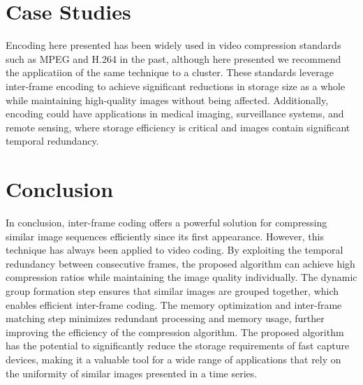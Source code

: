\documentclass[twocolumn]{article}
\begin{document}
\section{Case Studies}
Encoding here presented has been widely used in video compression standards such as MPEG and H.264 in the past, although here presented we recommend the applicatiion of the same technique to a cluster. These standards leverage inter-frame encoding to achieve significant reductions in storage size as a whole while maintaining high-quality images without being affected. Additionally, encoding could have applications in medical imaging, surveillance systems, and remote sensing, where storage efficiency is critical and images contain significant temporal redundancy.

\section{Conclusion}
In conclusion, inter-frame coding offers a powerful solution for compressing similar image sequences efficiently since its first appearance. However, this technique has always been applied to video coding. By exploiting the temporal redundancy between consecutive frames, the proposed algorithm can achieve high compression ratios while maintaining the image quality individually. The dynamic group formation step ensures that similar images are grouped together, which enables efficient inter-frame coding. The memory optimization and inter-frame matching step minimizes redundant processing and memory usage, further improving the efficiency of the compression algorithm. The proposed algorithm has the potential to significantly reduce the storage requirements of fast capture devices, making it a valuable tool for a wide range of applications that rely on the uniformity of similar images presented in a time series.
\end{document}
